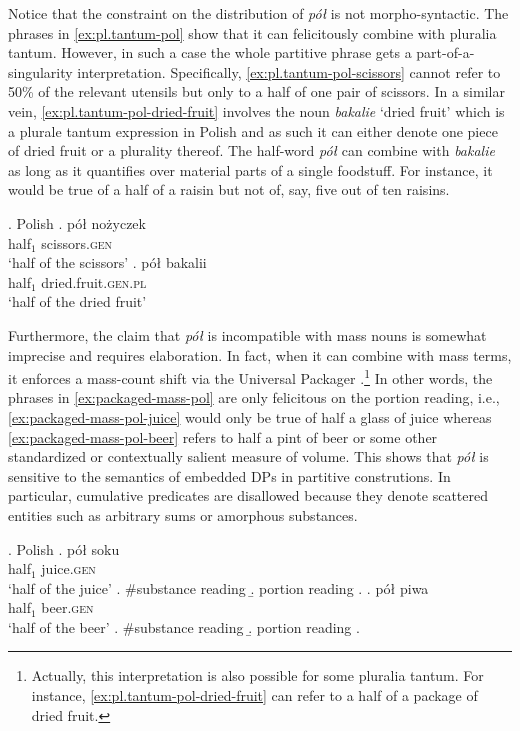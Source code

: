 Notice that the constraint on the distribution of \textit{pół} is not morpho-syntactic. The phrases in \ref{ex:pl.tantum-pol} show that it can felicitously combine with pluralia tantum. However, in such a case the whole partitive phrase gets a part-of-a-singularity interpretation. Specifically, \ref{ex:pl.tantum-pol-scissors} cannot refer to 50\% of the relevant utensils but only to a half of one pair of scissors. In a similar vein, \ref{ex:pl.tantum-pol-dried-fruit} involves the noun \textit{bakalie} `dried fruit' which is a plurale tantum expression in Polish and as such it can either denote one piece of dried fruit or a plurality thereof. The half-word \textit{pół} can combine with \textit{bakalie} as long as it quantifies over material parts of a single foodstuff. For instance, it would be true of a half of a raisin but not of, say, five out of ten raisins. 

	\ex. Polish\label{ex:pl.tantum-pol}
    \ag. pół nożyczek\\ 
	half$_1$ scissors\textsc{.gen}\\
	`half of the scissors'\label{ex:pl.tantum-pol-scissors}
	\bg. pół bakalii\\ 
	half$_1$ dried.fruit\textsc{.gen.pl}\\
	`half of the dried fruit'\label{ex:pl.tantum-pol-dried-fruit}

Furthermore, the claim that \textit{pół} is incompatible with mass nouns is somewhat imprecise and requires elaboration. In fact, when it can combine with mass terms, it enforces a mass-count shift via the Universal Packager \citep[see, e.g.,][]{bach1986algebra,jackendoff1991parts,landman1991structures}.\footnote{Actually, this interpretation is also possible for some pluralia tantum. For instance, \ref{ex:pl.tantum-pol-dried-fruit} can refer to a half of a package of dried fruit.} In other words, the phrases in \ref{ex:packaged-mass-pol}  are only felicitous on the portion reading, i.e., \ref{ex:packaged-mass-pol-juice} would only be true of half a glass of juice whereas \ref{ex:packaged-mass-pol-beer} refers to half a pint of beer or some other standardized or contextually salient measure of volume. This shows that \textit{pół} is sensitive to the semantics of embedded DPs in partitive construtions. In particular, cumulative predicates are disallowed because they denote scattered entities such as arbitrary sums or amorphous substances.

	\ex.\label{ex:packaged-mass-pol} Polish
    \ag. pół soku\label{ex:packaged-mass-pol-juice}\\ 
	half$_1$ juice\textsc{.gen}\\
	`half of the juice'
    \a. \#substance reading
    \b. portion reading
    \z.
	\bg. pół piwa\label{ex:packaged-mass-pol-beer}\\ 
	half$_1$ beer\textsc{.gen}\\
	`half of the beer'
    \a. \#substance reading
    \b. portion reading
    \z.

